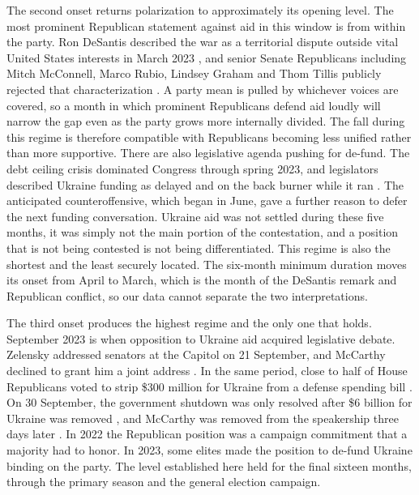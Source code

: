 The second onset returns polarization to approximately its opening level. The most prominent Republican statement against aid in this window is from within the party. Ron DeSantis described the war as a territorial dispute outside vital United States interests in March 2023 \citep{garrityRepublicansSlamDeSantis2023}, and senior Senate Republicans including Mitch McConnell, Marco Rubio, Lindsey Graham and Thom Tillis publicly rejected that characterization \citep{garrityRepublicansSlamDeSantis2023}. A party mean is pulled by whichever voices are covered, so a month in which prominent Republicans defend aid loudly will narrow the gap even as the party grows more internally divided. The fall during this regime is therefore compatible with Republicans becoming less unified rather than more supportive. There are also legislative agenda pushing for de-fund. The debt ceiling crisis dominated Congress through spring 2023, and legislators described Ukraine funding as delayed and on the back burner while it ran \citep{dressUkraineAidDries2023}. The anticipated counteroffensive, which began in June, gave a further reason to defer the next funding conversation. Ukraine aid was not settled during these five months, it was simply not the main portion of the contestation, and a position that is not being contested is not being differentiated. This regime is also the shortest and the least securely located. The six-month minimum duration moves its onset from April to March, which is the month of the DeSantis remark and Republican conflict, so our data cannot separate the two interpretations.

The third onset produces the highest regime and the only one that holds. September 2023 is when opposition to Ukraine aid acquired legislative debate. Zelensky addressed senators at the Capitol on 21 September, and McCarthy declined to grant him a joint address \citep{grovesGovernmentFundingPackageOct2023}. In the same period, close to half of House Republicans voted to strip \$300 million for Ukraine from a defense spending bill \citep{frekingUkraineAidDropped2023}. On 30 September, the government shutdown was only resolved after \$6 billion for Ukraine was removed \citep{harrisCongressAvoidsGovernment2023}, and McCarthy was removed from the speakership three days later \citep{mascaroHow6Billion2023}. In 2022 the Republican position was a campaign commitment that a majority had to honor. In 2023, some elites made the position to de-fund Ukraine binding on the party. The level established here held for the final sixteen months, through the primary season and the general election campaign.

